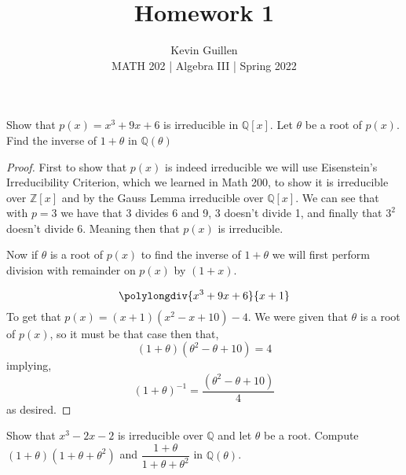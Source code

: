 \documentclass[11pt]{article}
\newenvironment{problem}[2][Problem\!]{\begin{tcolorbox}\begin{trivlist}
\item[\hskip \labelsep {\bfseries #1}\hskip \labelsep {\bfseries #2}]}{\end{trivlist}\end{tcolorbox}}
\newcommand{\zz}{\mathbb Z}   %
\newcommand{\qq}{\mathbb Q}   %
\begin{document}
 
\title{Homework 1}
\author{Kevin Guillen\\[0.5em]
MATH 202 | Algebra III | Spring 2022}
\date{} 
\maketitle


\begin{problem} {13.1.1}
    Show that $p(x) = x^{3} + 9x + 6$ is irreducible in $\qq[x]$. Let $\theta$ be a root of $p(x)$. Find the inverse of $1+\theta$ in $\qq(\theta)$
\end{problem}
\begin{proof}
    First to show that $p(x)$ is indeed irreducible we will use Eisenstein's Irreducibility Criterion, which we learned in Math 200, to show it is irreducible over $\zz[x]$ and by the Gauss Lemma irreducible over $\qq[x]$. We can see that with $p = 3$ we have that 3 divides 6 and 9, 3 doesn't divide 1, and finally that $3^{2}$ doesn't divide 6. Meaning then that $p(x)$ is irreducible.

    Now if $\theta$ is a root of $p(x)$ to find the inverse of $1 + \theta$ we will first perform division with remainder on $p(x)$ by $(1 + x)$.

    \[ \polylongdiv{x^{3} + 9x + 6}{x + 1}\]
    To get that $p(x) = (x + 1)(x^{2 } - x + 10) - 4$. We were given that $\theta$ is a root of $p(x)$, so it must be that case then that,
    \[(1+\theta)(\theta^{2} - \theta + 10) = 4\]
    implying,
    \[(1 + \theta)^{-1} = \dfrac{(\theta^{2} - \theta + 10)}{4}\]
    as desired.

\end{proof}
\newpage
\begin{problem}{13.1.2}
    Show that $x^{3} -2x -2$ is irreducible over $\qq$ and let $\theta$ be a root. Compute $(1 + \theta)(1 + \theta + \theta^{2})$ and $\dfrac{1 + \theta}{1 + \theta + \theta^{2}}$ in $\qq(\theta)$.
\end{problem}
\end{document}
